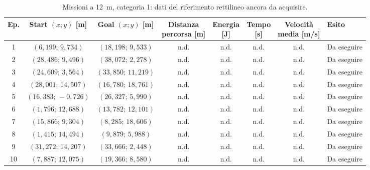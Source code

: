 \begin{table}[H]
\centering
\caption{Missioni a 12~m, categoria 1: dati del riferimento rettilineo ancora da acquisire.}
\label{tab:big-map-12m-baseline-cat1}
\begingroup
\fontsize{9}{11}\selectfont
\setlength{\tabcolsep}{2.5pt}
\renewcommand{\arraystretch}{1.2}
\begin{tabular}{@{}c cc cccc l@{}}
\toprule
Ep. & \shortstack{Start $(x;y)$\\{}[m]} & \shortstack{Goal $(x;y)$\\{}[m]} & \shortstack{Distanza\\percorsa [m]} & \shortstack{Energia\\{}[J]} & \shortstack{Tempo\\{}[s]} & \shortstack{Velocità\\media [m/s]} & Esito \\
\midrule
1 & $(6{,}199;\,9{,}734)$ & $(18{,}198;\,9{,}533)$ & n.d. & n.d. & n.d. & n.d. & Da eseguire \\
2 & $(28{,}486;\,9{,}496)$ & $(38{,}072;\,2{,}278)$ & n.d. & n.d. & n.d. & n.d. & Da eseguire \\
3 & $(24{,}609;\,3{,}564)$ & $(33{,}850;\,11{,}219)$ & n.d. & n.d. & n.d. & n.d. & Da eseguire \\
4 & $(28{,}001;\,14{,}507)$ & $(16{,}780;\,18{,}761)$ & n.d. & n.d. & n.d. & n.d. & Da eseguire \\
5 & $(16{,}383;\,-0{,}726)$ & $(26{,}327;\,5{,}990)$ & n.d. & n.d. & n.d. & n.d. & Da eseguire \\
6 & $(1{,}796;\,12{,}688)$ & $(13{,}782;\,12{,}101)$ & n.d. & n.d. & n.d. & n.d. & Da eseguire \\
7 & $(15{,}866;\,9{,}304)$ & $(8{,}285;\,18{,}606)$ & n.d. & n.d. & n.d. & n.d. & Da eseguire \\
8 & $(1{,}415;\,14{,}494)$ & $(9{,}879;\,5{,}988)$ & n.d. & n.d. & n.d. & n.d. & Da eseguire \\
9 & $(31{,}272;\,14{,}207)$ & $(33{,}666;\,2{,}448)$ & n.d. & n.d. & n.d. & n.d. & Da eseguire \\
10 & $(7{,}887;\,12{,}075)$ & $(19{,}366;\,8{,}580)$ & n.d. & n.d. & n.d. & n.d. & Da eseguire \\
\bottomrule
\end{tabular}
\endgroup
\end{table}

